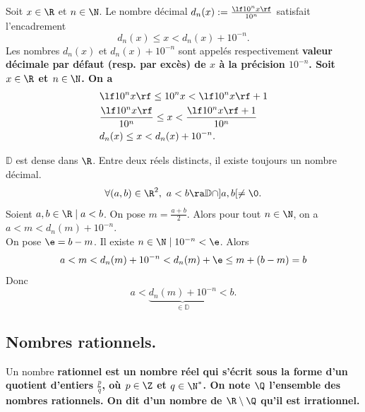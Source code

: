 \documentclass[11pt]{article}
\renewcommand*{\D}{\mathbb{D}}
\begin{document}
\vspace*{-0.5cm}

\begin{prop}{}{}
    Soit $x\in\R$ et $n\in\N$. Le nombre décimal $d_n(x):=\frac{\lf 10^nx\rf}{10^n}$ satisfait l'encadrement
    \begin{equation*}
        d_n(x) \leq x<d_n(x)+10^{-n}.
    \end{equation*}
    Les nombres $d_n(x)$ et $d_n(x)+10^{-n}$ sont appelés respectivement \bf{valeur décimale} par défaut (resp. par excès) de $x$ à la précision $10^{-n}$.
    \tcblower
    Soit $x\in\R$ et $n\in\N$. On a
    \begin{align*}
        &\lf 10^nx \rf \leq 10^nx<\lf 10^nx\rf + 1\\
        &\frac{\lf 10^n x \rf}{10^n} \leq x < \frac{\lf 10^n x\rf + 1}{10^n}\\
        &d_n(x)\leq x < d_n(x)+10^{-n}.
    \end{align*}
\end{prop}

\vspace*{-0.5cm}

\begin{corr}{$\D$ est dense dans $\R$.}{}
    Entre deux réels distincts, il existe toujours un nombre décimal.
    \begin{equation*}
        \forall (a,b)\in\R^2,~a<b\ra \D\cap]a,b[\neq\0.
    \end{equation*}
    \tcblower
    Soient $a,b\in\R\mid a<b$. On pose $m=\frac{a+b}{2}$. Alors pour tout $n\in\N$, on a $a<m<d_n(m)+10^{-n}$.\\
    On pose $\e=b-m$. Il existe $n\in\N\mid10^{-n}<\e$. Alors
    \begin{equation*}
        a<m<d_n(m)+10^{-n}<d_n(m)+\e\leq m+(b-m)=b
    \end{equation*}
    Donc
    \begin{equation*}
        a<\underbrace{d_n(m)+10^{-n}}_{\in\D}<b.
    \end{equation*}
\end{corr}

\subsection{Nombres rationnels.}

\begin{defi}{}{}
    Un nombre \bf{rationnel} est un nombre réel qui s'écrit sous la forme d'un quotient d'entiers $\frac{p}{q}$, où $p\in\Z$ et $q\in\N^*$. On note $\Q$ l'ensemble des nombres rationnels.\n
    On dit d'un nombre de $\R\setminus\Q$ qu'il est \bf{irrationnel}.
\end{defi}
\end{document}
